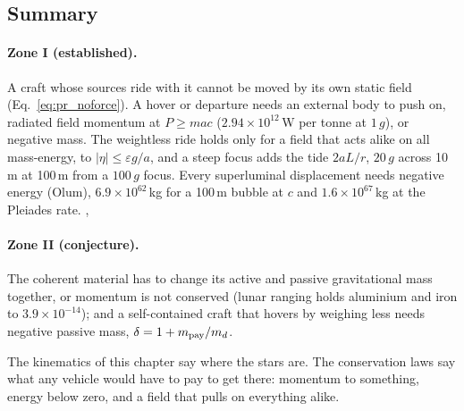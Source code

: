 \subsection{Summary}\label{sec:pr_summary}
\paragraph{Zone I (established).} A craft whose sources ride with it cannot be moved by its own static field (Eq.~\eqref{eq:pr_noforce}). A hover or
departure needs an external body to push on, radiated field momentum at $P\ge mac$ ($2.94\times10^{12}$\,W per tonne at $1\,g$), or negative mass.
The weightless ride holds only for a field that acts alike on all mass-energy, to $|\eta|\le\varepsilon g/a$, and a steep focus adds the tide
$2aL/r$, $20\,g$ across 10\,m at 100\,m from a $100\,g$ focus. Every superluminal displacement needs negative energy (Olum), $6.9\times10^{62}$\,kg
for a 100\,m bubble at $c$ and $1.6\times10^{67}$\,kg at the Pleiades rate. \derived, \calc

\paragraph{Zone II (conjecture).} The coherent material has to change its active and passive gravitational mass together, or momentum is not
conserved (lunar ranging holds aluminium and iron to $3.9\times10^{-14}$); and a self-contained craft that hovers by weighing less needs negative
passive mass, $\delta=1+m_{\rm pay}/m_d$. \conjecture

The kinematics of this chapter say where the stars are. The conservation laws say what any vehicle would have to pay to get there:
momentum to something, energy below zero, and a field that pulls on everything alike. \interp

